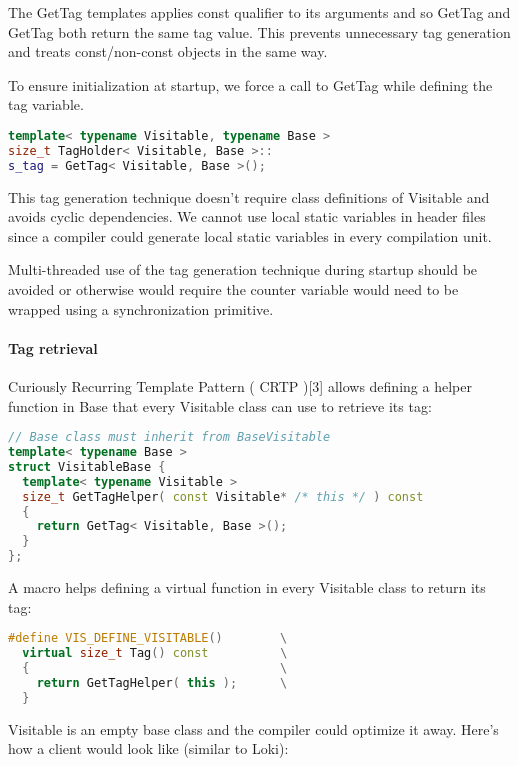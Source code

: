 \documentclass{book}
\begin{document}
The GetTag templates applies const qualifier to its arguments and so GetTag and GetTag both return the same tag value. This prevents unnecessary tag generation and treats const/non-const objects in the same way.

To ensure initialization at startup, we force a call to GetTag while defining the tag variable.

\begin{lstlisting}[caption={visitor pattern sample code 5, commandexample.cpp},language=C++]
template< typename Visitable, typename Base >
size_t TagHolder< Visitable, Base >::
s_tag = GetTag< Visitable, Base >();
\end{lstlisting}

This tag generation technique doesn't require class definitions of Visitable and avoids cyclic dependencies.
We cannot use local static variables in header files since a compiler could generate local static variables in every compilation unit.

Multi-threaded use of the tag generation technique during startup should be avoided or otherwise would require the counter variable would need to be wrapped using a synchronization primitive.
\paragraph{Tag retrieval}

Curiously Recurring Template Pattern ( CRTP )[3] allows defining a helper function in Base that every Visitable class can use to retrieve its tag:

\begin{lstlisting}[caption={visitor pattern sample code 6-6},language=C++]
// Base class must inherit from BaseVisitable
template< typename Base >
struct VisitableBase {
  template< typename Visitable >
  size_t GetTagHelper( const Visitable* /* this */ ) const
  {
    return GetTag< Visitable, Base >();
  }
};
\end{lstlisting}

A macro helps defining a virtual function in every Visitable class to return its tag:

\begin{lstlisting}[caption={visitor pattern sample code 6-7},language=C++]
#define VIS_DEFINE_VISITABLE()        \
  virtual size_t Tag() const          \
  {                                   \
    return GetTagHelper( this );      \
  }
\end{lstlisting}

Visitable is an empty base class and the compiler could optimize it away. Here's how a client would look like (similar to Loki):
\end{document}
